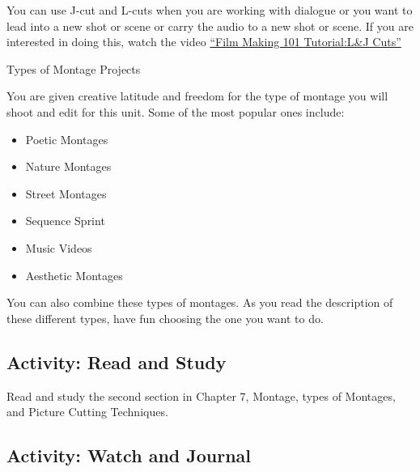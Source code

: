 \documentclass[
]{book}
\providecommand{\tightlist}{%
  \setlength{\itemsep}{0pt}\setlength{\parskip}{0pt}}
\begin{document}
You can use J-cut and L-cuts when you are working with dialogue or you want to lead into a new shot or scene or carry the audio to a new shot or scene. If you are interested in doing this, watch the video \href{https://www.youtube.com/watch?v=PAvJevWUVsc}{``Film Making 101 Tutorial:L\&J Cuts''}

{Types of Montage Projects}

You are given creative latitude and freedom for the type of montage you will shoot and edit for this unit. Some of the most popular ones include:

\begin{itemize}
\tightlist
\item
  Poetic Montages
\item
  Nature Montages
\item
  Street Montages
\item
  Sequence Sprint
\item
  Music Videos
\item
  Aesthetic Montages
\end{itemize}

You can also combine these types of montages. As you read the description of these different types, have fun choosing the one you want to do.

\hypertarget{activity-read-and-study-2}{%
\subsection*{Activity: Read and Study}\label{activity-read-and-study-2}}

\begin{reflect}
Read and study the second section in Chapter 7, Montage, types of Montages, and Picture Cutting Techniques.
\end{reflect}

\hypertarget{activity-watch-and-journal}{%
\subsection*{Activity: Watch and Journal}\label{activity-watch-and-journal}}
\end{document}
